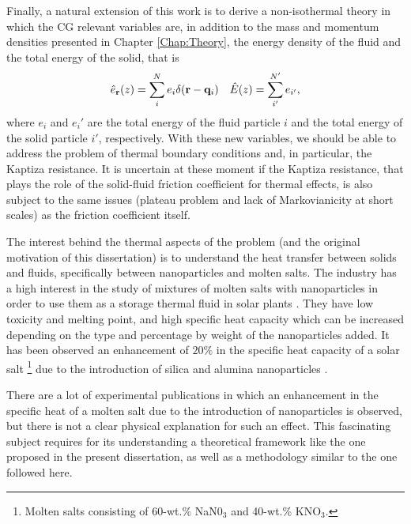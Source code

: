 \documentclass[b5paper,openright,10pt]{book}
\begin{document}

Finally, a natural extension of this work is to derive a non-isothermal theory in which the CG relevant variables are, in addition to the mass and momentum densities presented in Chapter \ref{Chap:Theory}, the energy density of the fluid and the total energy of the solid, that is
\begin{align}
  \hat{e}_{\bf r}(z) = \sum_i^N e_i\delta({\bf r}-{\bf q}_i) &&  \hat{E}(z)=\sum_{i'}^{N'}e_{i'},
\end{align}
where $e_i$ and $e_i'$ are the total energy of the fluid particle $i$ and the total energy of the solid particle $i'$, respectively. With these new variables, we should be able to address the problem of thermal boundary conditions and, in particular, the Kaptiza resistance. It is uncertain at these moment if the Kaptiza resistance, that plays the role of the solid-fluid friction coefficient for thermal effects, is also subject to the same issues (plateau problem and lack of Markovianicity at short scales) as the friction coefficient itself.

The interest behind the thermal aspects of the problem (and the original motivation of this dissertation) is to understand the heat transfer between solids and fluids, specifically between nanoparticles and molten salts. 
The industry has a high interest in the study of mixtures of molten salts with nanoparticles in order to use them as a storage thermal fluid in solar plants \cite{Mahian2013,Schuller2015b, Shahrul2014a,Goharshadi2013a,Serrano-Lopez2013}. 
They have low toxicity and melting point, and high specific heat capacity which can be increased depending on the type and percentage by weight of the nanoparticles added. 
It has been observed an enhancement of $20\%$  in the specific heat capacity of a solar
salt \footnote{Molten salts consisting of 60-wt.$\%$ NaN0$_3$ and 40-wt.\% KNO$_3$. } due to the introduction of silica and alumina nanoparticles \cite{Chieruzzi2013a}.
  
There are a lot of experimental publications in which an enhancement in the specific heat of a molten salt due to the introduction of nanoparticles \cite{Schuller2015b, Chieruzzi2013a,Khanafer2015a} is observed, but there is not a clear physical explanation for such an effect. This fascinating subject requires for its understanding a theoretical framework like the one proposed in the present dissertation, as well as a methodology similar to the one followed here.
\end{document}
